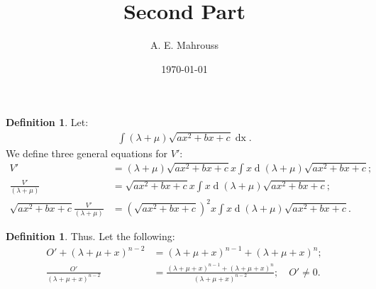 \documentclass[10pt]{article}
\title{Second Part}
\author{A. E. Mahrouss}
\date{\today}
\theoremstyle{plain}
\theoremstyle{definition}
\newtheorem{definition}[theorem]{Definition}
\theoremstyle{remark}
\begin{document}
\begin{definition}
	Let:
	\begin{align*}
		\int (\lambda + \mu)\sqrt{ax^2 + bx  +c} \operatorname{dx}.
	\end{align*}
	We define three general equations for $V'$:
	\begin{align*}
		V' &= (\lambda + \mu)\sqrt{ax^2 + bx  +c}x \int x \operatorname{d}(\lambda + \mu)\sqrt{ax^2 + bx  +c};\\
		\frac{V'}{(\lambda + \mu)} &= \sqrt{ax^2 + bx  +c}x \int x \operatorname{d}(\lambda + \mu)\sqrt{ax^2 + bx  +c};\\
		\sqrt{ax^2 + bx  +c}\frac{V'}{(\lambda + \mu)} &= (\sqrt{ax^2 + bx  +c})^{2}x \int x \operatorname{d}(\lambda + \mu)\sqrt{ax^2 + bx  +c}.
	\end{align*}
\end{definition}
\begin{definition}
	Thus. Let the following:
	\begin{align*}
		O' + (\lambda + \mu + x)^{n-2} &= (\lambda + \mu + x)^{n-1} + (\lambda + \mu + x)^{n};\\
		\frac{O'}{(\lambda + \mu + x)^{n-2}} &= \frac{(\lambda + \mu + x)^{n-1} + (\lambda + \mu + x)^{n}}{(\lambda + \mu + x)^{n-2}}; \quad O' \neq 0.
	\end{align*}
\end{definition}

\nocite{*}


\end{document}

